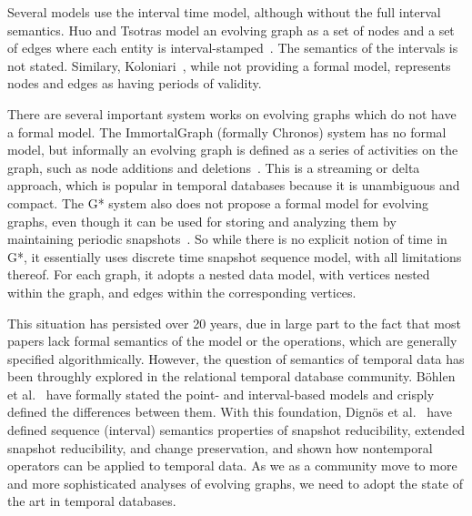 Several models use the interval time model, although without the full
interval semantics.  Huo and Tsotras model an evolving graph as a set
of nodes and a set of edges where each entity is
interval-stamped~\cite{Huo2014}.  The semantics of the intervals is
not stated.  Similary, Koloniari~\cite{Koloniari2012}, while not
providing a formal model, represents nodes and edges as having periods
of validity.

There are several important system works on evolving graphs which do
not have a formal model.  The ImmortalGraph (formally Chronos) system
has no formal model, but informally an evolving graph is defined as a
series of activities on the graph, such as node additions and
deletions~\cite{Miao2015}.  This is a streaming or delta approach,
which is popular in temporal databases because it is unambiguous and
compact.  The G* system also does not propose a formal model for
evolving graphs, even though it can be used for storing and analyzing
them by maintaining periodic snapshots~\cite{Labouseur2015}.  So while
there is no explicit notion of time in G*, it essentially uses
discrete time snapshot sequence model, with all limitations thereof.
For each graph, it adopts a nested data model, with vertices nested
within the graph, and edges within the corresponding vertices.

This situation has persisted over 20 years, due in large part to the
fact that most papers lack formal semantics of the model or the
operations, which are generally specified algorithmically.  However,
the question of semantics of temporal data has been throughly explored
in the relational temporal database community.  B{\"{o}}hlen et
al.~\cite{Bohlen1998} have formally stated the point- and
interval-based models and crisply defined the differences between
them.  With this foundation, Dign{\"{o}}s et al.~\cite{Dignos2012}
have defined sequence (interval) semantics properties of snapshot
reducibility, extended snapshot reducibility, and change preservation,
and shown how nontemporal operators can be applied to temporal data.
As we as a community move to more and more sophisticated analyses of
evolving graphs, we need to adopt the state of the art in temporal
databases.
